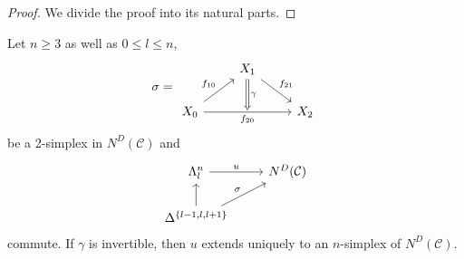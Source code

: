 \begin{proof}
	We divide the proof into its natural parts.
\end{proof}
	
\begin{prop}
	Let $ n \geq 3 $ as well as $ 0 \leq l \leq n $, 
	\[
	\sigma
	=
	\begin{tikzcd}	
		&
		X_1
		\ar[rd, "f_{21}"]
		\ar[d, Rightarrow, "\gamma"] 
		&
		\\
		X_0
		\ar[ru, "f_{10}" ]
		\ar[rr, "f_{20}"' ]
		&
		{}
		&
		X_2
	\end{tikzcd}
	\]
	be a 2-simplex in $ N^D ( \mathcal{ C } ) $ and 
	\[
	\begin{tikzcd}
		\Lambda_l^n 
		\ar[r, "u"]
		&
		N^D ( \mathcal{ C } )
		\\
		\Delta^{ \{ l - 1 , l , l + 1 \} }
		\ar[ru, " \sigma "]
		\ar[u]
	\end{tikzcd}
	\]
	commute.
	If $ \gamma $ is invertible, then $ u $ extends uniquely to an $ n $-simplex of $ N^D ( \mathcal{ C } ) $.
 \end{prop}

